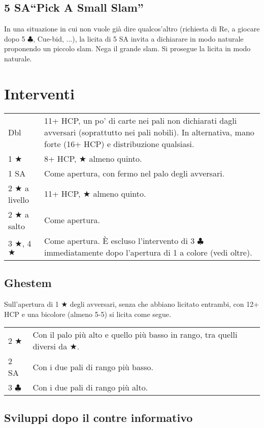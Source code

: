 \documentclass[a4paper,10pt]{article}
\renewcommand{\c}{$\clubsuit$\xspace}
\renewcommand{\j}{$\bigstar$\xspace}
\newcommand{\sa}{SA\xspace}
\newcommand{\smallspace}{\vskip0.3cm}
\newenvironment{twocol}
  {\smallspace\noindent\begin{tabular}{l p{0.78\textwidth}}}
  {\end{tabular}\smallspace}
\begin{document}
\subsection{5 \sa ``Pick A Small Slam''}

In una situazione in cui non vuole già dire qualcos'altro (richiesta di Re, a giocare dopo 5 \c, Cue-bid, ...), la licita di 5 \sa invita a dichiarare in modo naturale proponendo un piccolo slam. Nega il grande slam. Si prosegue la licita in modo naturale.



\pagebreak
\section{Interventi}

\begin{twocol}
  Dbl & 11+ HCP, un po' di carte nei pali non dichiarati dagli avversari (soprattutto nei pali nobili). In alternativa, mano forte (16+ HCP) e distribuzione qualsiasi.\\
  1 \j & 8+ HCP, \j almeno quinto.\\
  1 \sa & Come apertura, con fermo nel palo degli avversari.\\
  2 \j a livello & 11+ HCP, \j almeno quinto.\\
  2 \j a salto & Come apertura.\\
  3 \j, 4 \j & Come apertura. È escluso l'intervento di 3 \c immediatamente dopo l'apertura di 1 a colore (vedi oltre).
\end{twocol}

\subsection{Ghestem}
Sull'apertura di 1 \j degli avversari, senza che abbiano licitato entrambi, con 12+ HCP e una bicolore (almeno 5-5) si licita come segue.
\begin{twocol}
  2 \j & Con il palo più alto e quello più basso in rango, tra quelli diversi da \j.\\
  2 \sa & Con i due pali di rango più basso.\\
  3 \c & Con i due pali di rango più alto.
\end{twocol}

\subsection{Sviluppi dopo il contre informativo}
\end{document}
